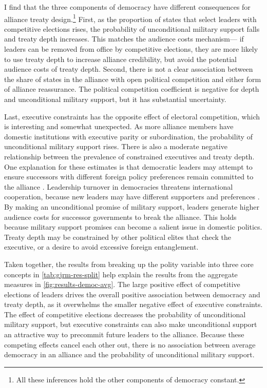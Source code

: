 \documentclass[12pt]{article}
\begin{document}
I find that the three components of democracy have different consequences for alliance treaty design.\footnote{All these inferences hold the other components of democracy constant.}
First, as the proportion of states that select leaders with competitive elections rises, the probability of unconditional military support falls and treaty depth increases.
This matches the audience costs mechanism--- if leaders can be removed from office by competitive elections, they are more likely to use treaty depth to increase alliance credibility, but avoid the potential audience costs of treaty depth. 
Second, there is not a clear association between the share of states in the alliance with open political competition and either form of alliance reassurance.
The political competition coefficient is negative for depth and unconditional military support, but it has substantial uncertainty.


Last, executive constraints has the opposite effect of electoral competition, which is interesting and somewhat unexpected. 
As more alliance members have domestic institutions with executive parity or subordination, the probability of unconditional military support rises. 
There is also a moderate negative relationship between the prevalence of constrained executives and treaty depth.  
One explanation for these estimates is that democratic leaders may attempt to ensure successors with different foreign policy preferences remain committed to the alliance \cite{Mattes2012a}. 
Leadership turnover in democracies threatens international cooperation, because new leaders may have different supporters and preferences \citep{Lobell2004, Narizny2007, Leedsetal2009}. 
By making an unconditional promise of military support, leaders generate higher audience costs for successor governments to break the alliance. 
This holds because military support promises can become a salient issue in domestic politics. 
Treaty depth may be constrained by other political elites that check the executive, or a desire to avoid excessive foreign entanglement.  


Taken together, the results from breaking up the polity variable into three core concepts in \autoref{tab:gjrm-res-split} help explain the results from the aggregate measures in \autoref{fig:results-democ-avg}. 
The large positive effect of competitive elections of leaders drives the overall positive association between democracy and treaty depth, as it overwhelms the smaller negative effect of executive constraints. 
The effect of competitive elections decreases the probability of unconditional military support, but executive constraints can also make unconditional support an attractive way to precommit future leaders to the alliance. 
Because these competing effects cancel each other out, there is no association between average democracy in an alliance and the probability of unconditional military support. 
\end{document}

